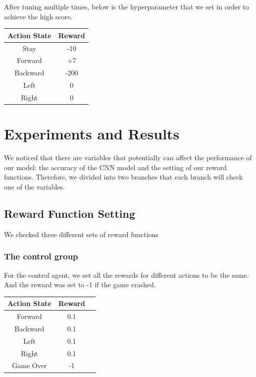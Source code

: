 \documentclass{article}
\begin{document}
After tuning multiple times, below is the hyperparameter that we set in order to achieve the high score. \par 

\begin{center}
    \begin{tabular}{ | c | c |} 
        \hline
        Action State & Reward \\ 
        \hline
        Stay & -10\\ 
        \hline
        Forward & +7\\ 
        \hline
        Backward & -200 \\ 
        \hline
        Left & 0 \\
        \hline
        Right & 0 \\ 
        \hline
    \end{tabular}   
\end{center}

\section{Experiments and Results}
We noticed that there are variables that potentially can affect the performance of our model: the accuracy of the CNN model and the setting of our reward functions. Therefore, we divided into two branches that each branch will check one of the variables. 

\subsection{Reward Function Setting}
We checked three different sets of reward functions

\subsubsection{The control group}
For the control agent, we set all the rewards for different actions to be the same. And the reward was set to -1 if the game crashed.

\begin{center}
    \begin{tabular}{ | c | c| c | } 
    \hline
    Action State & Reward\\ 
    \hline
    Forward & 0.1\\ 
    \hline
    Backward & 0.1\\ 
    \hline
    Left & 0.1\\ 
    \hline
    Right & 0.1\\ 
    \hline
    Game Over & -1\\ 
    \hline
    \end{tabular}
\end{center}
\end{document}
